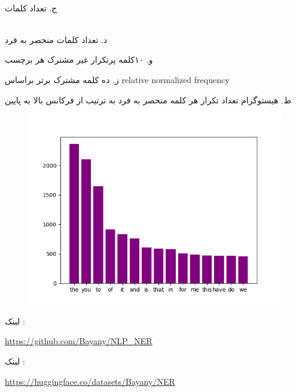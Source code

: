 \\

ج. تعداد کلمات
\begin{latin}
\begin{center}
  \fontsize{8pt}{9pt}\ttfamily
\end{center}
\end{latin}

\\

د. تعداد کلمات منحصر به فرد

\begin{latin}
\begin{center}
  \fontsize{8pt}{9pt}\ttfamily
\end{center}
\end{latin}


\newpage

و.  ۱۰کلمه پرتکرار غیر مشترک هر برچسب
\begin{latin}
\begin{center}
    \fontsize{4pt}{7pt}\ttfamily
\end{center}
\end{latin}

ز. ده کلمه مشترک برتر براساس relative normalized frequency
\begin{latin}
\begin{center}
    \fontsize{4pt}{7pt}\ttfamily
\end{center}
\end{latin}


ط. هیستوگرام تعداد تکرار هر کلمه منحصر به فرد به ترتیب از فرکانس بالا به پایین
\begin{figure}[H]
    \centering
    \includegraphics[width=0.7\linewidth]{../stats/hist.png}
   \end{figure}
   
لینک  :

 \begin{latin}
 \url{https://github.com/Bayany/NLP_NER}
 \end{latin}

لینک :
 \begin{latin}
\url{https://huggingface.co/datasets/Bayany/NER}
 \end{latin}
 
